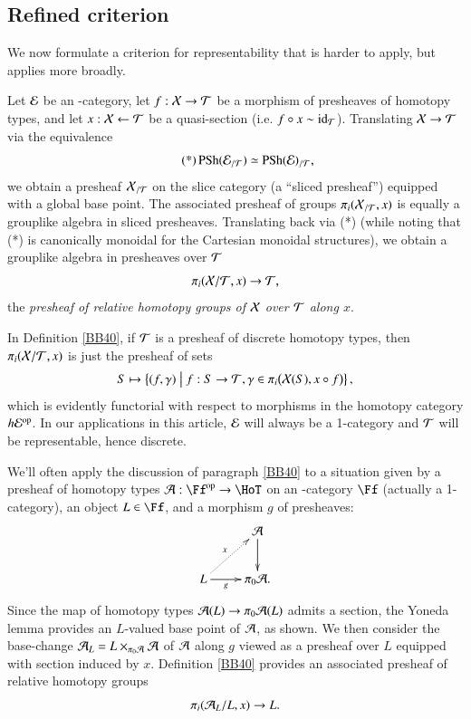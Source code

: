 \subsection{Refined criterion}
\label{sSec:Refined}

We now formulate a criterion for representability that is harder to apply, but applies more broadly.


\begin{ssDefinition}
\label{BB40}
Let $\mathcal{E}$ be an \oo-category, let $f: \mathcal{X} \to \mathcal{T}$ be a morphism of presheaves of homotopy types, and let $x: \mathcal{X} \leftarrow \mathcal{T}$ be a quasi-section (i.e. $f \circ x \sim \mathrm{id}_{\mathcal{T}}$). Translating $\mathcal{X} \to \mathcal{T}$ via the equivalence
\[
\tag{*}
\operatorname{PSh}(\mathcal{E}_{/\mathcal{T}}) \simeq \operatorname{PSh}(\mathcal{E})_{/\mathcal{T}},
\]
we obtain a presheaf $\mathcal{X}_{/\mathcal{T}}$ on the slice category (a ``sliced presheaf'') equipped with a global base point. The associated presheaf of groups $\pi_i(\mathcal{X}_{/\mathcal{T}}, x)$ is equally a grouplike algebra in sliced presheaves. Translating back via (*) (while noting that (*) is canonically monoidal for the Cartesian monoidal structures), we obtain a grouplike algebra in presheaves over $\mathcal{T}$
\[
\pi_i (\mathcal{X} / \mathcal{T}, x) \to \mathcal{T},
\]
the \emph{presheaf of relative homotopy groups of $\mathcal{X}$ over $\mathcal{T}$ along $x$}.
\end{ssDefinition}

\begin{ssRemark}
In Definition \ref{BB40}, if $\mathcal{T}$ is a presheaf of discrete homotopy types, then $\pi_i(\mathcal{X}/\mathcal{T}, x)$ is just the presheaf of sets 
\[
S \mapsto
\left\{ (f, \gamma) \; \middle| \; f: S \to \mathcal{T}, \gamma \in \pi_i \big(\mathcal{X}(S), x \circ f \big) \right\},
\]
which is evidently functorial with respect to morphisms in the homotopy category $h\mathcal{E}^{\mathrm{op}}$. In our applications in this article, $\mathcal{E}$ will always be a 1-category and $\mathcal{T}$ will be representable, hence discrete. 
\end{ssRemark}


\begin{ssRemark}
\label{BB41}
We'll often apply the discussion of paragraph \ref{BB40} to a situation given by a presheaf of homotopy types $\Aa: \Ff\op \to \HoT$ on an \oo-category $\Ff$ (actually a 1-category), an object $L \in \Ff$, and a morphism $g$ of presheaves: 
\[
\xymatrix{
& \Aa \ar[d] 
\\
L \ar[r]_-g \ar@{.>}[ur]^-x & \pi_0 \Aa.
}
\]
Since the map of homotopy types $\mathcal{A}(L) \to \pi_0\mathcal{A}(L)$ admits a section, the Yoneda lemma provides an $L$-valued base point of $\mathcal{A}$, as shown. We then consider the base-change $\mathcal{A}_L = L \times_{\pi_0\mathcal{A}} \mathcal{A}$ of $\mathcal{A}$ along $g$ viewed as a presheaf over $L$ equipped with section induced by $x$. Definition \ref{BB40} provides an associated presheaf of relative homotopy groups 
\[
\pi_i(\mathcal{A}_L / L, x) \to L.
\]
\end{ssRemark}


